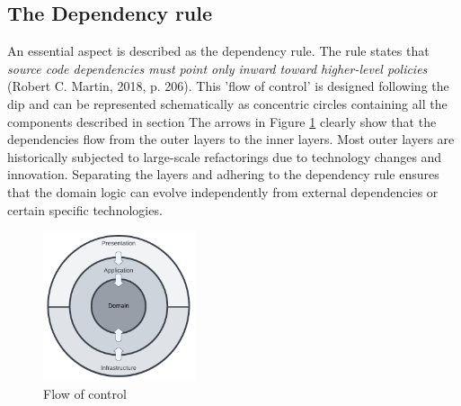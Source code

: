 \subsection{The Dependency rule} \label{sebsec:dependency_rule}

An essential aspect is described as the dependency rule. The rule states that
\textit{source code dependencies must point only inward toward higher-level policies}
(Robert C. Martin, 2018, p. 206). This ’flow of control’ is designed following the
\gls{dip} and can be represented schematically as concentric circles containing all the
components described in section  The arrows in Figure
\ref{fig_modulair_components} clearly show that the dependencies flow from the outer
layers to the inner layers. Most outer layers are historically subjected to large-scale
refactorings due to technology changes and innovation. Separating the layers and adhering
to the dependency rule ensures that the domain logic can evolve independently from
external dependencies or certain specific technologies.

\begin{figure}[H]
    \centering
    \includegraphics[width=0.4\textwidth]{figures/ca_diagram.pdf}
    \caption[Flow of control]{Flow of control}
    \label{fig_modulair_components}
\end{figure}